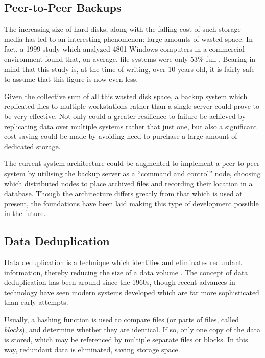 \subsection{Peer-to-Peer Backups}

The increasing size of hard disks, along with the falling cost of such storage
media has led to an interesting phenomenon: large amounts of wasted space. In
fact, a 1999 study which analyzed 4801 Windows computers in a commercial
environment found that, on average, file systems were only 53\% full
\cite{douceur1999}. Bearing in mind that this study is, at the time of writing,
over 10 years old, it is fairly safe to assume that this figure is now even less.

Given the collective sum of all this wasted disk space, a backup system which
replicated files to multiple workstations rather than a single server could
prove to be very effective. Not only could a greater resilience to failure be
achieved by replicating data over multiple systems rather that just one, but
also a significant cost saving could be made by avoiding need to purchase
a large amount of dedicated storage.

The current system architecture could be augmented to implement a peer-to-peer
system by utilising the backup server as a ``command and control'' node,
choosing which distributed nodes to place archived files and recording their
location in a database. Though the architecture differs greatly from that which
is used at present, the foundations have been laid making this type of
development possible in the future.

\subsection{Data Deduplication}

Data deduplication is a technique which identifies and eliminates redundant
information, thereby reducing the size of a data volume \cite{geer2008}. The
concept of data deduplication has been around since the 1960s, though recent
advances in technology have seen modern systems developed which are far more
sophisticated than early attempts.

Usually, a hashing function is used to compare files (or parts of files, called
\emph{blocks}), and determine whether they are identical. If so, only one copy
of the data is stored, which may be referenced by multiple separate files or
blocks. In this way, redundant data is eliminated, saving storage space.

